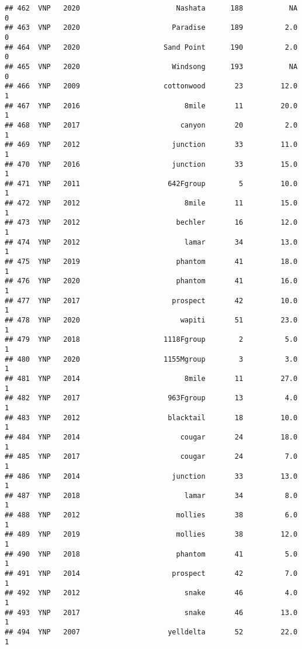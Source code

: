 \documentclass[
]{article}
\begin{document}
\begin{verbatim}
## 462  VNP   2020                       Nashata      188           NA       0
## 463  VNP   2020                      Paradise      189          2.0       0
## 464  VNP   2020                    Sand Point      190          2.0       0
## 465  VNP   2020                      Windsong      193           NA       0
## 466  YNP   2009                    cottonwood       23         12.0       1
## 467  YNP   2016                         8mile       11         20.0       1
## 468  YNP   2017                        canyon       20          2.0       1
## 469  YNP   2012                      junction       33         11.0       1
## 470  YNP   2016                      junction       33         15.0       1
## 471  YNP   2011                     642Fgroup        5         10.0       1
## 472  YNP   2012                         8mile       11         15.0       1
## 473  YNP   2012                       bechler       16         12.0       1
## 474  YNP   2012                         lamar       34         13.0       1
## 475  YNP   2019                       phantom       41         18.0       1
## 476  YNP   2020                       phantom       41         16.0       1
## 477  YNP   2017                      prospect       42         10.0       1
## 478  YNP   2020                        wapiti       51         23.0       1
## 479  YNP   2018                    1118Fgroup        2          5.0       1
## 480  YNP   2020                    1155Mgroup        3          3.0       1
## 481  YNP   2014                         8mile       11         27.0       1
## 482  YNP   2017                     963Fgroup       13          4.0       1
## 483  YNP   2012                     blacktail       18         10.0       1
## 484  YNP   2014                        cougar       24         18.0       1
## 485  YNP   2017                        cougar       24          7.0       1
## 486  YNP   2014                      junction       33         13.0       1
## 487  YNP   2018                         lamar       34          8.0       1
## 488  YNP   2012                       mollies       38          6.0       1
## 489  YNP   2019                       mollies       38         12.0       1
## 490  YNP   2018                       phantom       41          5.0       1
## 491  YNP   2014                      prospect       42          7.0       1
## 492  YNP   2012                         snake       46          4.0       1
## 493  YNP   2017                         snake       46         13.0       1
## 494  YNP   2007                     yelldelta       52         22.0       1

\end{verbatim}
\end{document}
